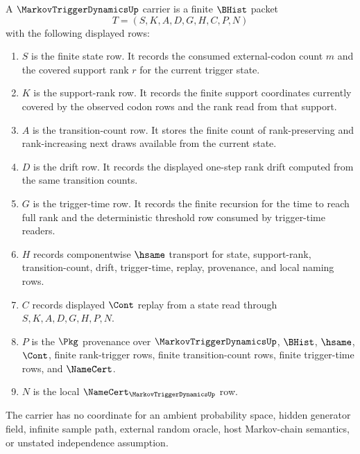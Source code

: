 \begin{definition}
\label{def:markov-trigger-dynamics-carrier}
A $\MarkovTriggerDynamicsUp$ carrier is a finite $\BHist$ packet
$$
T=(S,K,A,D,G,H,C,P,N)
$$
with the following displayed rows:
\begin{enumerate}
\item $S$ is the finite state row. It records the consumed external-codon count $m$ and the covered support rank $r$ for the current trigger state.
\item $K$ is the support-rank row. It records the finite support coordinates currently covered by the observed codon rows and the rank read from that support.
\item $A$ is the transition-count row. It stores the finite count of rank-preserving and rank-increasing next draws available from the current state.
\item $D$ is the drift row. It records the displayed one-step rank drift computed from the same transition counts.
\item $G$ is the trigger-time row. It records the finite recursion for the time to reach full rank and the deterministic threshold row consumed by trigger-time readers.
\item $H$ records componentwise $\hsame$ transport for state, support-rank, transition-count, drift, trigger-time, replay, provenance, and local naming rows.
\item $C$ records displayed $\Cont$ replay from a state read through $S,K,A,D,G,H,P,N$.
\item $P$ is the $\Pkg$ provenance over $\MarkovTriggerDynamicsUp$, $\BHist$, $\hsame$, $\Cont$, finite rank-trigger rows, finite transition-count rows, finite trigger-time rows, and $\NameCert$.
\item $N$ is the local $\NameCert_{\MarkovTriggerDynamicsUp}$ row.
\end{enumerate}
The carrier has no coordinate for an ambient probability space, hidden generator field, infinite sample path, external random oracle, host Markov-chain semantics, or unstated independence assumption.
\end{definition}

